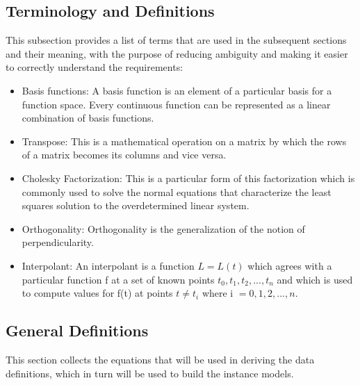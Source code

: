 \documentclass[12pt]{article}
\begin{document}
\subsection{Terminology and  Definitions}

This subsection provides a list of terms that are used in the subsequent
sections and their meaning, with the purpose of reducing ambiguity and making it
easier to correctly understand the requirements:

\begin{itemize}

\item Basis functions: A basis function is an element of a particular basis for a function space. Every continuous function can be represented as a linear combination of basis functions.

\item Transpose: This is a mathematical operation on a matrix by which the rows of a matrix becomes its columns and vice versa.

\item Cholesky Factorization: This is a particular form of this factorization which is commonly used to solve the normal equations that characterize the least squares solution to the overdetermined linear system.

\item Orthogonality: Orthogonality is the generalization of the notion of perpendicularity.

\item Interpolant: An interpolant is a function $L=L(t)$ which agrees with a particular function f at a set of known points $t_0,t_1,t_2,...,t_n$ and which is used to compute values for f(t) at points $t \neq t_i$ where i $=0,1,2,...,n$.

\end{itemize}



\subsection{General Definitions}\label{sec_gendef}

This section collects the equations that will be used in deriving the
data definitions, which in turn will be used to build the instance models.\\
\end{document}
